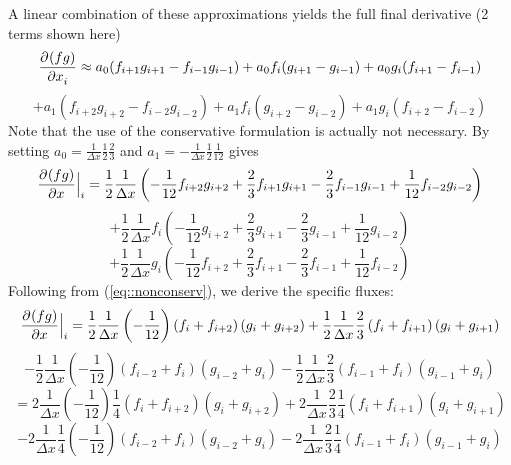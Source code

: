 \documentclass[12pt]{article}
\numberwithin{equation}{section}
\numberwithin{figure}{section}
\begin{document}
A linear combination of these approximations yields the full final derivative (2 terms shown here)
\begin{equation*}
\frac{\partial^{} (fg)}{\partial x_i^{}} \approx 
a_0(f_{i+1}g_{i+1} - f_{i-1}g_{i-1}) + a_0f_i(g_{i+1}-g_{i-1}) + a_0g_i(f_{i+1}-f_{i-1})
\end{equation*}
\begin{equation}
+a_1(f_{i+2}g_{i+2} - f_{i-2}g_{i-2}) + a_1f_i(g_{i+2}-g_{i-2}) + a_1g_i(f_{i+2}-f_{i-2})
\end{equation}
Note that the use of the conservative formulation is actually not necessary. By setting $a_0 = \frac{1}{\Delta x}\frac{1}{2}\frac{2}{3}$ and
$a_1 = -\frac{1}{\Delta x}\frac{1}{2}\frac{1}{12}$ gives
\begin{equation*}
\frac{\partial^{} (fg)}{\partial x^{}}\Big|_i = \frac{1}{2}\frac{1}{\Delta x}\left(-\frac{1}{12}f_{i+2}g_{i+2} + \frac{2}{3}f_{i+1}g_{i+1} - \frac{2}{3}f_{i-1}g_{i-1} + \frac{1}{12}f_{i-2}g_{i-2}\right)
\end{equation*}
\begin{equation*}
+\frac{1}{2}\frac{1}{\Delta x}f_i\left(-\frac{1}{12}g_{i+2} + \frac{2}{3}g_{i+1} - \frac{2}{3}g_{i-1} + \frac{1}{12}g_{i-2}\right)
\end{equation*}
\begin{equation}\label{eq::nonconserv}
+\frac{1}{2}\frac{1}{\Delta x}g_i\left(-\frac{1}{12}f_{i+2} + \frac{2}{3}f_{i+1} - \frac{2}{3}f_{i-1} + \frac{1}{12}f_{i-2}\right)
\end{equation}
Following from (\ref{eq::nonconserv}), we derive the specific fluxes:
\begin{equation*}
\frac{\partial^{} (fg)}{\partial x^{}}\Big|_i = \frac{1}{2}\frac{1}{\Delta x}\left(-\frac{1}{12}\right)\left(f_{i} + f_{i+2}\right)\left(g_{i} + g_{i+2}\right)
+\frac{1}{2}\frac{1}{\Delta x}\frac{2}{3}\left(f_{i} + f_{i+1}\right)\left(g_{i} + g_{i+1}\right)
\end{equation*}
\begin{equation*}
-\frac{1}{2}\frac{1}{\Delta x}\left(-\frac{1}{12}\right)\left(f_{i-2} + f_{i}\right)\left(g_{i-2} + g_{i}\right)
-\frac{1}{2}\frac{1}{\Delta x}\frac{2}{3}\left(f_{i-1} + f_{i}\right)\left(g_{i-1} + g_{i}\right)
\end{equation*}
\begin{equation*}
= 2\frac{1}{\Delta x}\left(-\frac{1}{12}\right)\frac{1}{4}\left(f_{i} + f_{i+2}\right)\left(g_{i} + g_{i+2}\right)
+2\frac{1}{\Delta x}\frac{2}{3}\frac{1}{4}\left(f_{i} + f_{i+1}\right)\left(g_{i} + g_{i+1}\right)
\end{equation*}
\begin{equation}
-2\frac{1}{\Delta x}\frac{1}{4}\left(-\frac{1}{12}\right)\left(f_{i-2} + f_{i}\right)\left(g_{i-2} + g_{i}\right)
-2\frac{1}{\Delta x}\frac{2}{3}\frac{1}{4}\left(f_{i-1} + f_{i}\right)\left(g_{i-1} + g_{i}\right)
\end{equation}
\end{document}
